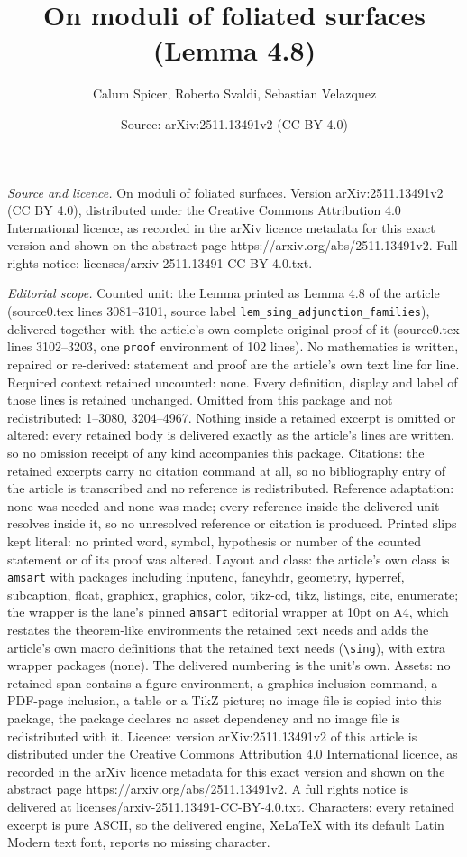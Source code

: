 \documentclass[10pt,a4paper]{amsart}
\title[On moduli of foliated surfaces]{On moduli of foliated surfaces (Lemma 4.8)}
\author{Calum Spicer, Roberto Svaldi, Sebastian Velazquez}
\date{Source: arXiv:2511.13491v2 (CC BY 4.0)}
\begin{document}
\maketitle

\noindent\emph{Source and licence.} On moduli of foliated surfaces. Version arXiv:2511.13491v2 (CC BY 4.0), distributed under the Creative Commons Attribution 4.0 International licence, as recorded in the arXiv licence metadata for this exact version and shown on the abstract page https://arxiv.org/abs/2511.13491v2. Full rights notice: licenses/arxiv-2511.13491-CC-BY-4.0.txt.\par\smallskip

\noindent\textit{Editorial scope.} Counted unit: the Lemma printed as Lemma 4.8 of the article (source0.tex lines 3081--3101, source label \texttt{lem\_sing\_adjunction\_families}), delivered together with the article's own complete original proof of it (source0.tex lines 3102--3203, one \texttt{proof} environment of 102 lines). No mathematics is written, repaired or re-derived: statement and proof are the article's own text line for line. Required context retained uncounted: none. Every definition, display and label of those lines is retained unchanged. Omitted from this package and not redistributed: 1--3080, 3204--4967. Nothing inside a retained excerpt is omitted or altered: every retained body is delivered exactly as the article's lines are written, so no omission receipt of any kind accompanies this package. Citations: the retained excerpts carry no citation command at all, so no bibliography entry of the article is transcribed and no reference is redistributed. Reference adaptation: none was needed and none was made; every reference inside the delivered unit resolves inside it, so no unresolved reference or citation is produced. Printed slips kept literal: no printed word, symbol, hypothesis or number of the counted statement or of its proof was altered. Layout and class: the article's own class is \texttt{amsart} with packages including inputenc, fancyhdr, geometry, hyperref, subcaption, float, graphicx, graphics, color, tikz-cd, tikz, listings, cite, enumerate; the wrapper is the lane's pinned \texttt{amsart} editorial wrapper at 10pt on A4, which restates the theorem-like environments the retained text needs and adds the article's own macro definitions that the retained text needs (\texttt{\textbackslash sing}), with extra wrapper packages (none). The delivered numbering is the unit's own. Assets: no retained span contains a figure environment, a graphics-inclusion command, a PDF-page inclusion, a table or a TikZ picture; no image file is copied into this package, the package declares no asset dependency and no image file is redistributed with it. Licence: version arXiv:2511.13491v2 of this article is distributed under the Creative Commons Attribution 4.0 International licence, as recorded in the arXiv licence metadata for this exact version and shown on the abstract page https://arxiv.org/abs/2511.13491v2. A full rights notice is delivered at licenses/arxiv-2511.13491-CC-BY-4.0.txt. Characters: every retained excerpt is pure ASCII, so the delivered engine, XeLaTeX with its default Latin Modern text font, reports no missing character.
\end{document}
